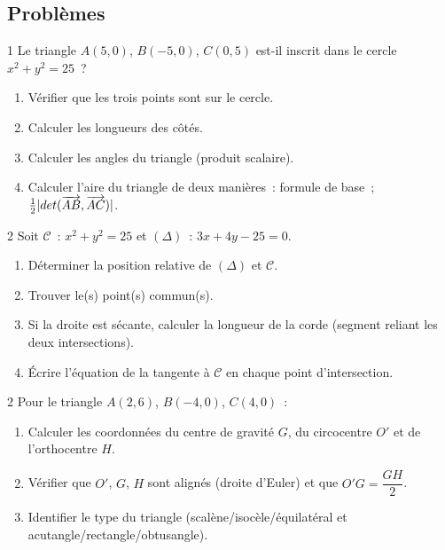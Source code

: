 \subsection*{Probl\`emes}

\begin{probleme}{1}
Le triangle $A(5,0)$, $B(-5,0)$, $C(0,5)$ est-il inscrit dans le cercle
$x^2+y^2=25$~?
\begin{enumerate}
  \item V\'erifier que les trois points sont sur le cercle.
  \item Calculer les longueurs des c\^ot\'es.
  \item Calculer les angles du triangle (produit scalaire).
  \item Calculer l'aire du triangle de deux mani\`eres~:
        formule de base~; $\frac{1}{2}|det(\overrightarrow{AB},\overrightarrow{AC})|$.
\end{enumerate}
\end{probleme}

\begin{probleme}{2}
Soit $\mathcal{C}$~: $x^2+y^2=25$ et $(\Delta)$~: $3x+4y-25=0$.
\begin{enumerate}
  \item D\'eterminer la position relative de $(\Delta)$ et $\mathcal{C}$.
  \item Trouver le(s) point(s) commun(s).
  \item Si la droite est s\'ecante, calculer la longueur de la corde
        (segment reliant les deux intersections).
  \item \'Ecrire l'\'equation de la tangente \`a $\mathcal{C}$ en chaque
        point d'intersection.
\end{enumerate}
\end{probleme}

\begin{probleme}{2}
Pour le triangle $A(2,6)$, $B(-4,0)$, $C(4,0)$~:
\begin{enumerate}
  \item Calculer les coordonn\'ees du centre de gravité $G$, du circocentre $O'$
        et de l'orthocentre $H$.
  \item V\'erifier que $O'$, $G$, $H$ sont align\'es (droite d'Euler)
        et que $O'G = \dfrac{GH}{2}$.
  \item Identifier le type du triangle (scalène/isoc\`ele/\'equilat\'eral
        et acutangle/rectangle/obtusangle).
\end{enumerate}
\end{probleme}

